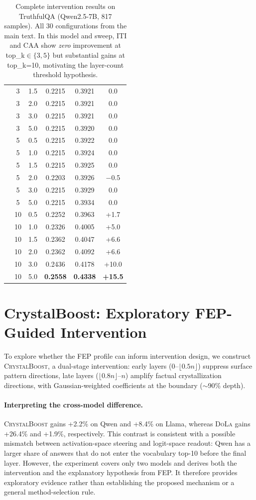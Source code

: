 \documentclass[11pt]{article}
\newcommand{\iti}{\textsc{ITI}}
\newcommand{\dola}{\textsc{DoLa}}
\newcommand{\crystalboost}{\textsc{CrystalBoost}}
\newcommand{\caa}{\textsc{CAA}}
\begin{document}
\begin{table}[H]
{\begin{tabular}{lccccc}
 & 3 & 1.5 & 0.2215 & 0.3921 & 0.0 \\
 & 3 & 2.0 & 0.2215 & 0.3921 & 0.0 \\
 & 3 & 3.0 & 0.2215 & 0.3921 & 0.0 \\
 & 3 & 5.0 & 0.2215 & 0.3920 & 0.0 \\
 & 5 & 0.5 & 0.2215 & 0.3922 & 0.0 \\
 & 5 & 1.0 & 0.2215 & 0.3924 & 0.0 \\
 & 5 & 1.5 & 0.2215 & 0.3925 & 0.0 \\
 & 5 & 2.0 & 0.2203 & 0.3926 & $-$0.5 \\
 & 5 & 3.0 & 0.2215 & 0.3929 & 0.0 \\
 & 5 & 5.0 & 0.2215 & 0.3934 & 0.0 \\
 & 10 & 0.5 & 0.2252 & 0.3963 & +1.7 \\
 & 10 & 1.0 & 0.2326 & 0.4005 & +5.0 \\
 & 10 & 1.5 & 0.2362 & 0.4047 & +6.6 \\
 & 10 & 2.0 & 0.2362 & 0.4092 & +6.6 \\
 & 10 & 3.0 & 0.2436 & 0.4178 & +10.0 \\
 & 10 & 5.0 & \textbf{0.2558} & \textbf{0.4338} & \textbf{+15.5} \\
\bottomrule
\end{tabular}
}
\caption{Complete intervention results on TruthfulQA (Qwen2.5-7B, 817 samples). All 30 configurations from the main text. In this model and sweep, \iti{} and \caa{} show \emph{zero} improvement at top\_k$\in\{3,5\}$ but substantial gains at top\_k=10, motivating the layer-count threshold hypothesis.}
\label{tab:full_intervention_results}
\end{table}

\section{CrystalBoost: Exploratory FEP-Guided Intervention}
\label{app:crystalboost}

To explore whether the FEP profile can inform intervention design, we construct \crystalboost{}, a dual-stage intervention: early layers (0--$\lfloor 0.5n \rfloor$) suppress surface pattern directions, late layers ($\lfloor 0.8n \rfloor$--$n$) amplify factual crystallization directions, with Gaussian-weighted coefficients at the boundary ($\sim$90\% depth).

\paragraph{Interpreting the cross-model difference.} \crystalboost{} gains +2.2\% on Qwen and +8.4\% on Llama, whereas \dola{} gains +26.4\% and +1.9\%, respectively. This contrast is consistent with a possible mismatch between activation-space steering and logit-space readout: Qwen has a larger share of answers that do not enter the vocabulary top-10 before the final layer. However, the experiment covers only two models and derives both the intervention and the explanatory hypothesis from FEP. It therefore provides exploratory evidence rather than establishing the proposed mechanism or a general method-selection rule.
\end{document}
